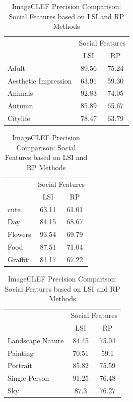 \begin{table}[!ht]
\caption{ ImageCLEF Precision Comparison: Social Features based on LSI and RP Methods} %
\centering
\begin{tabular}{|p{1.7cm}|c|c|}
 \hline
{\multirow{2}{*}{Labels}} & \multicolumn{2}{|c|}{Social Features} \\
\cline{2-3}
  & LSI & RP \\  [1ex] \hline
Adult & 89.56 & 75.24 \\  [1ex] \hline
Aesthetic Impression & 63.91 & 59.30 \\  [1ex] \hline
Animals & 92.83 & 74.05 \\  [1ex] \hline
Autumn & 85.89 & 65.67 \\  [1ex] \hline
Citylife & 78.47 & 63.79 \\  [1ex] \hline
\end{tabular}
 \hspace{1em}\vspace*{0.5cm}
 \begin{tabular}{|p{1.7cm}|c|c|}
  \hline
{\multirow{2}{*}{Labels}} & \multicolumn{2}{|c|}{Social Features} \\ \cline{2-3}
 & LSI & RP \\ \hline
cute & 63.11 & 61.01 \\  [1ex] \hline
Day & 84.15 & 68.67 \\  [1ex] \hline
Flowers & 93.54 & 69.79 \\  [1ex] \hline
Food & 87.51 & 71.04 \\  [1ex] \hline
Graffiti & 81.17 & 67.22 \\  [1ex] \hline
\end{tabular}
 \hspace{1em}\vspace*{0.5cm}
 \begin{tabular}{|p{1.7cm}|c|c|}
  \hline
{\multirow{2}{*}{Labels}} & \multicolumn{2}{|c|}{Social Features} \\ \cline{2-3}
 & LSI & RP \\ \hline
Landscape Nature & 84.45 & 75.04 \\  [1ex] \hline
Painting & 70.51 & 59.1 \\  [1ex] \hline
Portrait & 85.82 & 75.59 \\  [1ex] \hline
Single Person & 91.25 & 76.48 \\  [1ex] \hline
Sky & 87.3 & 76.27 \\  [1ex] \hline
\end{tabular}

\end{table}
